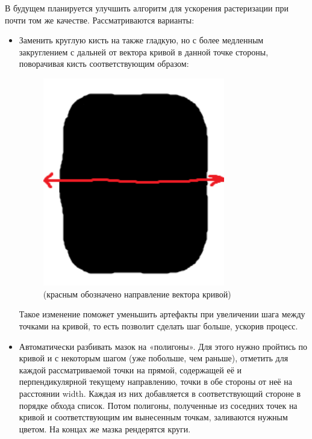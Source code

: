 \documentclass[11pt]{article}
\begin{document}
    В будущем планируется улучшить алгоритм для ускорения растеризации при почти том же качестве.
    Рассматриваются варианты:
    \begin{itemize}
        \item Заменить круглую кисть на также гладкую, но с более медленным закруглением с дальней от вектора кривой в данной точке стороны, поворачивая кисть соответствующим образом:
        \begin{figure}
            \centering
            \includegraphics[width=0.75\textwidth]{modern_brush.png}
            \caption{(красным обозначено направление вектора кривой)}
            \label{fig:modern_brush}
        \end{figure}
        Такое изменение поможет уменьшить артефакты при увеличении шага между точками на кривой, то есть позволит сделать шаг больше, ускорив процесс.

        \item Автоматически разбивать мазок на «полигоны».
                    Для этого нужно пройтись по кривой и с некоторым шагом (уже побольше, чем раньше),
                    отметить для каждой рассматриваемой точки на прямой, содержащей её и перпендикулярной текущему направлению, точки в обе стороны от неё на расстоянии width.
                    Каждая из них добавляется в соответствующий стороне в порядке обхода список.
                    Потом полигоны, полученные из соседних точек на кривой и соответствующим им вынесенным точкам, заливаются нужным цветом.
                    На концах же мазка рендерятся круги.


\end{itemize}
\end{document}
